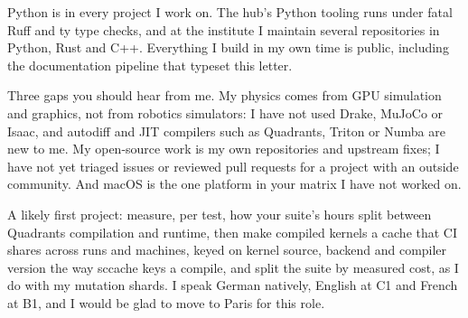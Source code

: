 {	Python is in every project I work on. The hub's Python tooling runs under fatal Ruff and ty type checks, and at the institute I maintain several repositories in Python, Rust and C++. Everything I build in my own time is public, including the documentation pipeline that typeset this letter.

	Three gaps you should hear from me. My physics comes from GPU simulation and graphics, not from robotics simulators: I have not used Drake, MuJoCo or Isaac, and autodiff and JIT compilers such as Quadrants, Triton or Numba are new to me. My open-source work is my own repositories and upstream fixes; I have not yet triaged issues or reviewed pull requests for a project with an outside community. And macOS is the one platform in your matrix I have not worked on.

	A likely first project: measure, per test, how your suite's hours split between Quadrants compilation and runtime, then make compiled kernels a cache that CI shares across runs and machines, keyed on kernel source, backend and compiler version the way sccache keys a compile, and split the suite by measured cost, as I do with my mutation shards. I speak German natively, English at C1 and French at B1, and I would be glad to move to Paris for this role.

}
